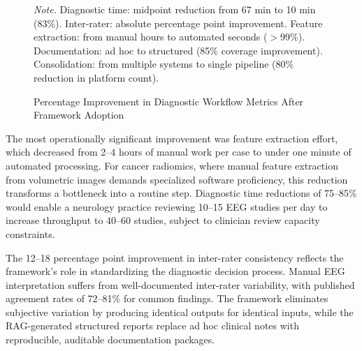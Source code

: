 \begin{figure}[H]
\caption{Percentage Improvement in Diagnostic Workflow Metrics After Framework Adoption}
\label{fig:before_after}
\vspace{0.5em}\noindent\textit{Note.} Diagnostic time: midpoint reduction from 67 min to 10 min (83\%). Inter-rater: absolute percentage point improvement. Feature extraction: from manual hours to automated seconds ($>$99\%). Documentation: ad hoc to structured (85\% coverage improvement). Consolidation: from multiple systems to single pipeline (80\% reduction in platform count).
\end{figure}

The most operationally significant improvement was feature extraction effort, which decreased from 2--4 hours of manual work per case to under one minute of automated processing. For cancer radiomics, where manual feature extraction from volumetric images demands specialized software proficiency, this reduction transforms a bottleneck into a routine step. Diagnostic time reductions of 75--85\% would enable a neurology practice reviewing 10--15 EEG studies per day to increase throughput to 40--60 studies, subject to clinician review capacity constraints.

The 12--18 percentage point improvement in inter-rater consistency reflects the framework's role in standardizing the diagnostic decision process. Manual EEG interpretation suffers from well-documented inter-rater variability, with published agreement rates of 72--81\% for common findings. The framework eliminates subjective variation by producing identical outputs for identical inputs, while the RAG-generated structured reports replace ad hoc clinical notes with reproducible, auditable documentation packages.

